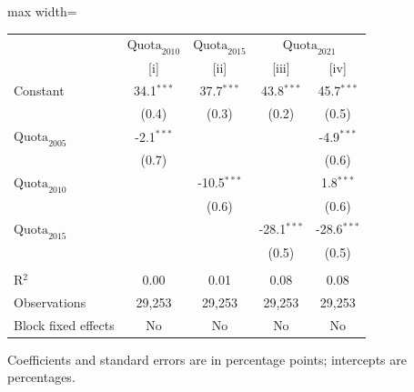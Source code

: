 
\begingroup
\centering
\scriptsize
\begin{adjustbox}{max width=\linewidth}
   \begin{threeparttable}[b]
      \begin{tabular}{lcccc}
         \toprule
          & \textit{$\text{Quota}_{2010}$} & \textit{$\text{Quota}_{2015}$} & \multicolumn{2}{c}{\textit{$\text{Quota}_{2021}$}}\\
                                & [i]          & [ii]          & [iii]         & [iv]\\
         \midrule
         Constant               & 34.1$^{***}$ & 37.7$^{***}$  & 43.8$^{***}$  & 45.7$^{***}$\\
                                & (0.4)        & (0.3)         & (0.2)         & (0.5)\\
         $\text{Quota}_{2005}$  & -2.1$^{***}$ &               &               & -4.9$^{***}$\\
                                & (0.7)        &               &               & (0.6)\\
         $\text{Quota}_{2010}$  &              & -10.5$^{***}$ &               & 1.8$^{***}$\\
                                &              & (0.6)         &               & (0.6)\\
         $\text{Quota}_{2015}$  &              &               & -28.1$^{***}$ & -28.6$^{***}$\\
                                &              &               & (0.5)         & (0.5)\\
          \\
         R$^2$                  & 0.00         & 0.01          & 0.08          & 0.08\\
         Observations           & 29,253       & 29,253        & 29,253        & 29,253\\
         Block fixed effects    & No           & No            & No            & No\\
         \bottomrule
      \end{tabular}

      \begin{tablenotes}
         \item  Coefficients and standard errors are in percentage points; intercepts are percentages.
      \end{tablenotes}
   \end{threeparttable}
\end{adjustbox}
\par\endgroup


